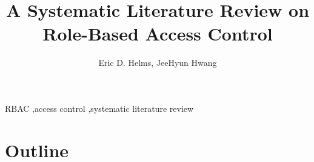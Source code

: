 \documentclass[3p,12pt]{elsarticle}
\begin{document}
\begin{frontmatter}

\title{A Systematic Literature Review on Role-Based Access Control}

\author{Eric D. Helms, JeeHyun Hwang}
\address{North Carolina State University}
\address{Department of Computer Science}
\address{890 Oval Drive, Box 8206}
\address{Raleigh, NC 27695-2858}




\begin{keyword}
RBAC \sep access control \sep systematic literature review
\end{keyword}

\end{frontmatter}













\section{Outline}
\end{document}
